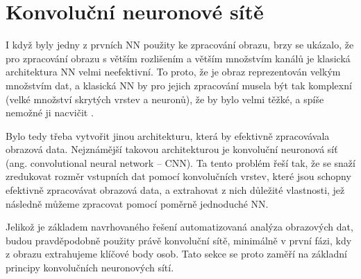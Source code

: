 \section{Konvoluční neuronové sítě}
\label{chap:CNN}

I když byly jedny z prvních NN použity ke zpracování obrazu, brzy se ukázalo,
že pro zpracování obrazu s větším rozlišením a větším množstvím kanálů je
klasická architektura NN velmi neefektivní. To proto, že je obraz reprezentován
velkým množstvím dat, a klasická NN by pro jejich zpracování musela být tak
komplexní (velké množství skrytých vrstev a neuronů), že by bylo velmi těžké, a
spíše nemožné ji nacvičit \cite{cnn_introduction}.

Bylo tedy třeba vytvořit jinou architekturu, která by efektivně zpracovávala
obrazová data. Nejznámější takovou architekturou je konvoluční neuronová síť
(ang. convolutional neural network – CNN). Ta tento problém řeší tak, že se
snaží zredukovat rozměr vstupních dat pomocí konvolučních vrstev, které jsou
schopny efektivně zpracovávat obrazová data, a extrahovat z nich důležité
vlastnosti, jež následně můžeme zpracovat pomocí poměrně jednoduché NN.

Jelikož je základem navrhovaného řešení automatizovaná analýza obrazových
dat, budou pravděpodobně použity právě konvoluční sítě, minimálně v první fázi,
kdy z obrazu extrahujeme klíčové body osob. Tato sekce se proto zaměří na
základní principy konvolučních neuronových sítí.




